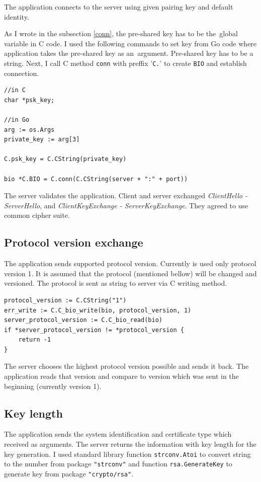 \documentclass[
  12pt, 
  digital, %
  notable,   %
  nolof,     %
  nolot,     %
]{fithesis3}
\begin{document}
The application connects to the server using given pairing key and default identity. 

As I wrote in the subsection \ref{conn}, the pre-shared key has to be the~global variable in C 
code. I used the following commands to set key from Go code where application takes the pre-shared 
key as an~argument. Pre-shared key has to be a string. Next, I call C method \texttt{conn} with 
preffix '\texttt{C.}' to create \texttt{BIO} and establish connection.

\begin{lstlisting}
//in C
char *psk_key;

//in Go
arg := os.Args
private_key := arg[3]

C.psk_key = C.CString(private_key) 

bio *C.BIO = C.conn(C.CString(server + ":" + port))
\end{lstlisting}
The server validates the application. Client and server exchanged \textit{ClientHello - ServerHello}, and \textit{ClientKeyExchange - ServerKeyExchange}. They agreed to use common cipher suite. 

\subsection{Protocol version exchange}

The application sends supported protocol version. Currently is used only protocol version 1. It is 
assumed that the protocol (mentioned bellow) will be changed and versioned. The protocol is sent as 
string to server via C writing method.

\begin{lstlisting}
protocol_version := C.CString("1")
err_write := C.C_bio_write(bio, protocol_version, 1)
server_protocol_version := C.C_bio_read(bio)
if *server_protocol_version != *protocol_version {
	return -1
} 
\end{lstlisting}
The server chooses the highest protocol version possible and sends it back. The application reads that version and compare to version which was sent in the beginning (currently version 1).

\subsection{Key length}

The application sends the system identification and certificate type which received as arguments. 
The server returns the information with key length for the key generation. I used standard library function \texttt{strconv.Atoi} to convert string to the number from package \texttt{"strconv"} and function \texttt{rsa.GenerateKey} to generate key from package \texttt{"crypto/rsa"}. 
\end{document}
